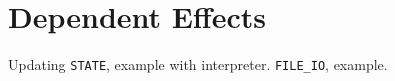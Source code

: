 \section{Dependent Effects}

Updating \texttt{STATE}, example with interpreter.
\texttt{FILE\_IO}, example.
